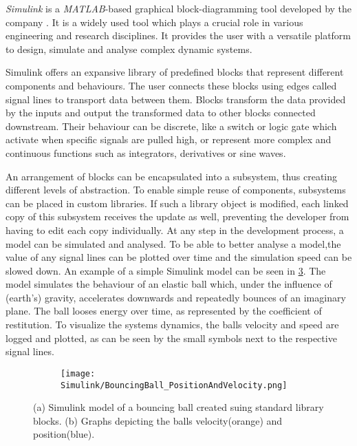 \textit{Simulink\textsuperscript{\textregistered}} is a \textit{MATLAB\textsuperscript{\textregistered}}-based graphical block-diagramming tool developed by the company . 
It is a widely used tool which plays a crucial role in various engineering and research disciplines.
It provides the user with a versatile platform to design, simulate and analyse complex dynamic systems.

Simulink offers an expansive library of predefined blocks that represent different components and behaviours.
The user connects these blocks using edges called signal lines to transport data between them.
Blocks transform the data provided by the inputs and output the transformed data to other blocks connected downstream.
Their behaviour can be discrete, like a switch or logic gate which activate when specific signals are pulled high, or represent more complex and continuous functions such as integrators, derivatives or sine waves.

An arrangement of blocks can be encapsulated into a subsystem, thus creating different levels of abstraction.
To enable simple reuse of components, subsystems can be placed in custom libraries.
If such a library object is modified, each linked copy of this subsystem receives the update as well, preventing the developer from having to edit each copy individually.
At any step in the development process, a model can be simulated and analysed.
To be able to better analyse a model,the value of any signal lines can be plotted over time and the simulation speed can be slowed down.
An example of a simple Simulink model can be seen in \ref{figure: Simulink bouncing ball example}.
The model simulates the behaviour of an elastic ball which, under the influence of (earth's) gravity, accelerates downwards and repeatedly bounces of an imaginary plane.
The ball looses energy over time, as represented by the coefficient of restitution.
To visualize the systems dynamics, the balls velocity and speed are logged and plotted, as can be seen by the small symbols next to the respective signal lines.

\begin{figure}[h!]
	\begin{subfigure}{.5\textwidth} %
		\centering
		\caption{}
		\label{figure: Simulink bouncing ball model}
	\end{subfigure}
	\begin{subfigure}{.5\textwidth}
		\centering
		\texttt{[image: Simulink/BouncingBall\_PositionAndVelocity.png]}  
		\caption{}
		\label{figure: Simulink bouncing ball graphs}
	\end{subfigure}
	\caption[Simulink bouncing ball example]{(a) Simulink model of a bouncing ball created suing standard library blocks. (b) Graphs depicting the balls velocity(orange) and position(blue).}
	\label{figure: Simulink bouncing ball example}
\end{figure}


